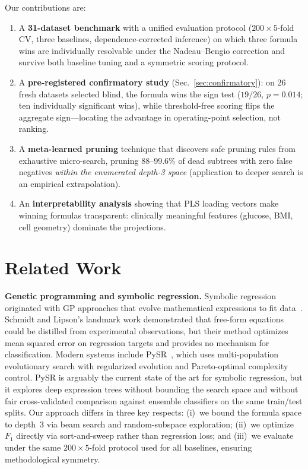 \documentclass[journal]{IEEEtran}
\begin{document}
Our contributions are:
\begin{enumerate}
\item A \textbf{31-dataset benchmark} with a unified evaluation
protocol ($200 \times 5$-fold CV, three baselines,
dependence-corrected inference) on which three formula wins are
individually resolvable under the Nadeau--Bengio correction and
survive both baseline tuning and a symmetric scoring protocol.
\item A \textbf{pre-registered confirmatory study}
(Sec.~\ref{sec:confirmatory}): on 26 fresh datasets selected
blind, the formula wins the sign test ($19/26$, $p = 0.014$; ten
individually significant wins), while threshold-free scoring
flips the aggregate sign---locating the advantage in
operating-point selection, not ranking.
\item A \textbf{meta-learned pruning} technique that discovers
safe pruning rules from exhaustive micro-search, pruning
88--99.6\% of dead subtrees with zero false negatives
\emph{within the enumerated depth-3 space} (application to
deeper search is an empirical extrapolation).
\item An \textbf{interpretability analysis} showing that PLS
loading vectors make winning formulas transparent:
clinically meaningful features (glucose, BMI, cell geometry)
dominate the projections.
\end{enumerate}

\section{Related Work}
\label{sec:related}

\textbf{Genetic programming and symbolic regression.}
Symbolic regression originated with GP approaches that evolve
mathematical expressions to fit data~\cite{schmidt2009distilling}.
Schmidt and Lipson's landmark work demonstrated that free-form
equations could be distilled from experimental observations, but their
method optimizes mean squared error on regression targets and provides
no mechanism for classification.  Modern systems include
PySR~\cite{cranmer2023interpretable}, which uses multi-population
evolutionary search with regularized evolution and Pareto-optimal
complexity control.  PySR is arguably the current state of the art for
symbolic regression, but it explores deep expression trees without
bounding the search space and without fair cross-validated comparison
against ensemble classifiers on the same train/test splits.  Our
approach differs in three key respects: (i)~we bound the formula space
to depth~3 via beam search and random-subspace exploration; (ii)~we optimize $F_1$
directly via sort-and-sweep rather than regression loss; and (iii)~we
evaluate under the same $200 \times 5$-fold protocol used for all
baselines, ensuring methodological symmetry.
\end{document}
